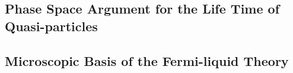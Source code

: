 \newpage
\setcounter{section}{10}
\setcounter{subsection}{0}
\subsection{Phase Space Argument for the Life Time of Quasi-particles}

\subsection{Microscopic Basis of the Fermi-liquid Theory}

